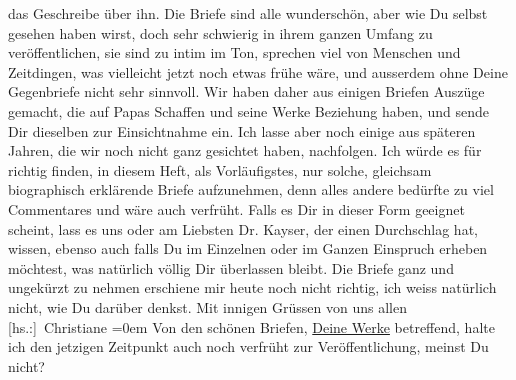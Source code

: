 \begin{ledgroupsized}[t]{13cm}
               das Geschreibe über ihn.\pend
           \pstart
           Die Briefe sind alle wunderschön, aber wie Du selbst gesehen haben wirst, doch sehr
               schwierig in ihrem ganzen Umfang zu veröffentlichen, sie sind zu intim im Ton,
               sprechen viel von Menschen und Zeitdingen, was vielleicht jetzt noch etwas frühe
               wäre, und ausserdem ohne Deine Gegenbriefe nicht sehr sinnvoll.\pend
           \pstart
           Wir haben daher aus einigen Briefen Auszüge gemacht, die auf Papas Schaffen und seine Werke Beziehung
               haben, und sende Dir dieselben zur Einsichtnahme ein. Ich lasse aber noch einige aus
               späteren Jahren, die wir noch nicht ganz gesichtet haben, nachfolgen. Ich würde es
               für richtig finden, in diesem Heft, als Vorläufigstes, nur solche, gleichsam
               biographisch erklärende Briefe aufzunehmen, denn alles andere bedürfte zu viel
               Commentares und wäre auch verfrüht.\pend
           \pstart
           Falls es Dir in dieser Form geeignet scheint, lass es uns oder am Liebsten Dr. Kayser, der einen Durchschlag hat, wissen,
               ebenso auch falls Du im Einzelnen oder im Ganzen Einspruch erheben möchtest, was
               natürlich völlig Dir überlassen bleibt. Die Briefe ganz und ungekürzt zu nehmen
               erschiene mir heute noch nicht richtig, ich weiss natürlich nicht, wie Du darüber
               denkst.\pend
           \pstart
           Mit innigen Grüssen von uns allen{\\[\baselineskip]}\spacefill\mbox{{[}hs.:{]} Christiane}\pend
           \leftskip=0em{}\pstart
           \noindent{}{\pb}Von den schönen Briefen, \uline{Deine Werke} betreffend, halte ich den jetzigen
                  Zeitpunkt auch noch verfrüht zur Veröffentlichung, meinst Du nicht?\pend
           
         
         \endnumbering{}\end{ledgroupsized}  \newcommand{\dateiname}{L02522}\newcommand{\titel}{Christiane Hofmannsthal an Arthur Schnitzler, 3. 9. 1929}\newcommand{\editorInnen}{Martin Anton Müller und Gerd-Hermann Susen}
      